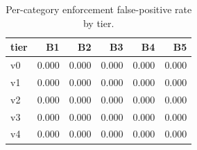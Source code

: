 \begin{table}[t]
\centering
\caption{Per-category enforcement false-positive rate by tier.}
\label{tab:category_fpr}
\begin{tabular}{lrrrrr}
\toprule
tier & B1 & B2 & B3 & B4 & B5 \\
\midrule
v0 & 0.000 & 0.000 & 0.000 & 0.000 & 0.000 \\
v1 & 0.000 & 0.000 & 0.000 & 0.000 & 0.000 \\
v2 & 0.000 & 0.000 & 0.000 & 0.000 & 0.000 \\
v3 & 0.000 & 0.000 & 0.000 & 0.000 & 0.000 \\
v4 & 0.000 & 0.000 & 0.000 & 0.000 & 0.000 \\
\bottomrule
\end{tabular}
\end{table}